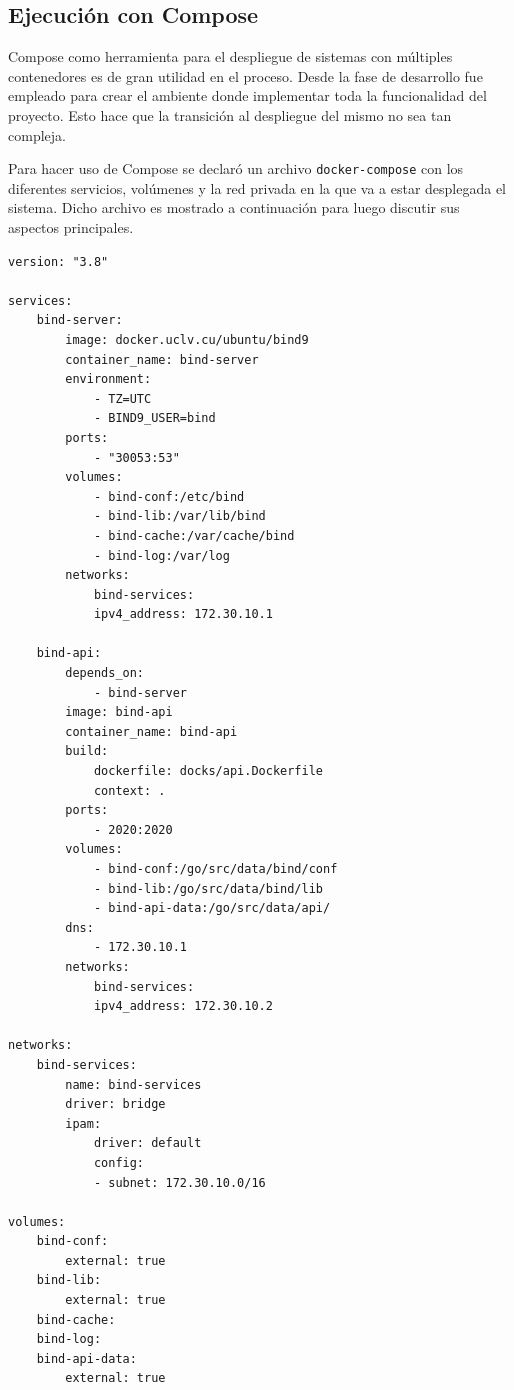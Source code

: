 \subsection{Ejecución con Compose}

Compose como herramienta para el despliegue de sistemas con múltiples contenedores es de gran utilidad en el proceso. Desde la fase de desarrollo fue empleado para crear el ambiente donde implementar toda la funcionalidad del proyecto. Esto hace que la transición al despliegue del mismo no sea tan compleja.

Para hacer uso de Compose se declaró un archivo \verb|docker-compose| con los diferentes servicios, volúmenes y la red privada en la que va a estar desplegada el sistema. Dicho archivo es mostrado a continuación para luego discutir sus aspectos principales.

\begin{lstlisting}[frame=single, caption=\textbf{docker-compose.yml} creado para el manejo de los servicios en la arquitectura]
version: "3.8"

services:
    bind-server:
        image: docker.uclv.cu/ubuntu/bind9
        container_name: bind-server
        environment:
            - TZ=UTC
            - BIND9_USER=bind
        ports:
            - "30053:53"
        volumes:
            - bind-conf:/etc/bind
            - bind-lib:/var/lib/bind
            - bind-cache:/var/cache/bind
            - bind-log:/var/log
        networks:
            bind-services:
            ipv4_address: 172.30.10.1

    bind-api:
        depends_on:
            - bind-server
        image: bind-api
        container_name: bind-api
        build:
            dockerfile: docks/api.Dockerfile
            context: .
        ports:
            - 2020:2020
        volumes:
            - bind-conf:/go/src/data/bind/conf
            - bind-lib:/go/src/data/bind/lib
            - bind-api-data:/go/src/data/api/
        dns:
            - 172.30.10.1
        networks:
            bind-services:
            ipv4_address: 172.30.10.2

networks:
    bind-services:
        name: bind-services
        driver: bridge
        ipam:
            driver: default
            config:
            - subnet: 172.30.10.0/16

volumes:
    bind-conf:
        external: true
    bind-lib:
        external: true
    bind-cache:
    bind-log:
    bind-api-data:
        external: true
\end{lstlisting}

